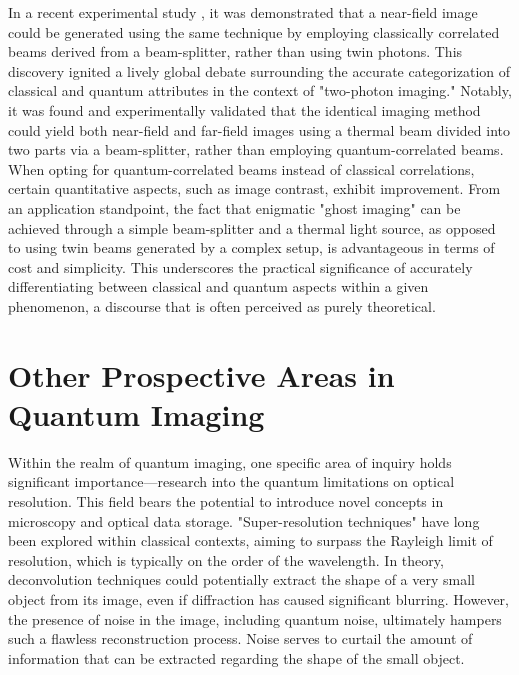 \documentclass{article}
\begin{document}
In a recent experimental study \cite{PhysRevLett.92.069901}, it was demonstrated that a near-field image could be generated using the same technique by employing classically correlated beams derived from a beam-splitter, rather than using twin photons. This discovery ignited a lively global debate surrounding the accurate categorization of classical and quantum attributes in the context of "two-photon imaging." Notably, it was found and experimentally validated \cite{PhysRevLett.93.093602} that the identical imaging method could yield both near-field and far-field images using a thermal beam divided into two parts via a beam-splitter, rather than employing quantum-correlated beams. When opting for quantum-correlated beams instead of classical correlations, certain quantitative aspects, such as image contrast, exhibit improvement. From an application standpoint, the fact that enigmatic "ghost imaging" can be achieved through a simple beam-splitter and a thermal light source, as opposed to using twin beams generated by a complex setup, is advantageous in terms of cost and simplicity. This underscores the practical significance of accurately differentiating between classical and quantum aspects within a given phenomenon, a discourse that is often perceived as purely theoretical.

\section{Other Prospective Areas in Quantum Imaging}

Within the realm of quantum imaging, one specific area of inquiry holds significant importance—research into the quantum limitations on optical resolution. This field bears the potential to introduce novel concepts in microscopy and optical data storage. "Super-resolution techniques" have long been explored within classical contexts, aiming to surpass the Rayleigh limit of resolution, which is typically on the order of the wavelength. In theory, deconvolution techniques could potentially extract the shape of a very small object from its image, even if diffraction has caused significant blurring. However, the presence of noise in the image, including quantum noise, ultimately hampers such a flawless reconstruction process. Noise serves to curtail the amount of information that can be extracted regarding the shape of the small object.
\end{document}
